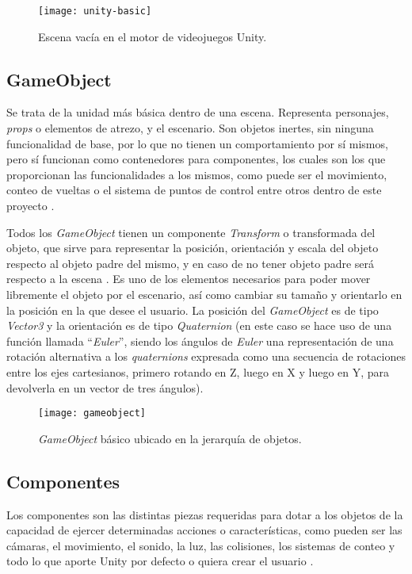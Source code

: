 \begin{figure}[h]
	\centering
	\texttt{[image: unity-basic]}
	\caption{Escena vacía en el motor de videojuegos Unity.}
	\label{fig:unity-basic}
\end{figure}

\subsection{GameObject}

Se trata de la unidad más básica dentro de una escena. Representa personajes, \textit{props} o elementos de atrezo, y el escenario. Son objetos inertes, sin ninguna funcionalidad de base, por lo que no tienen un comportamiento por sí mismos, pero sí funcionan como contenedores para componentes, los cuales son los que proporcionan las funcionalidades a los mismos, como puede ser el movimiento, conteo de vueltas o el sistema de puntos de control entre otros dentro de este proyecto \cite{doc:gameobject}.

Todos los \textit{GameObject} tienen un componente \textit{Transform} o transformada del objeto, que sirve para representar la posición, orientación y escala del objeto respecto al objeto padre del mismo, y en caso de no tener objeto padre será respecto a la escena \cite{doc:transform}. Es uno de los elementos necesarios para poder mover libremente el objeto por el escenario, así como cambiar su tamaño y orientarlo en la posición en la que desee el usuario. La posición del \textit{GameObject} es de tipo \textit{Vector3} y la orientación es de tipo \textit{Quaternion} (en este caso se hace uso de una función llamada ``\textit{Euler}'', siendo los ángulos de \textit{Euler} una representación de una rotación alternativa a los \textit{quaternions} expresada como una secuencia de rotaciones entre los ejes cartesianos, primero rotando en Z, luego en X y luego en Y, para devolverla en un vector de tres ángulos).

\begin{figure}[h]
	\centering
	\texttt{[image: gameobject]}
	\caption{\textit{GameObject} básico ubicado en la jerarquía de objetos.}
	\label{fig:gameobject}
\end{figure}

\subsection{Componentes}

Los componentes son las distintas piezas requeridas para dotar a los objetos de la capacidad de ejercer determinadas acciones o características, como pueden ser las cámaras, el movimiento, el sonido, la luz, las colisiones, los sistemas de conteo y todo lo que aporte Unity por defecto o quiera crear el usuario \cite{doc:component}.

